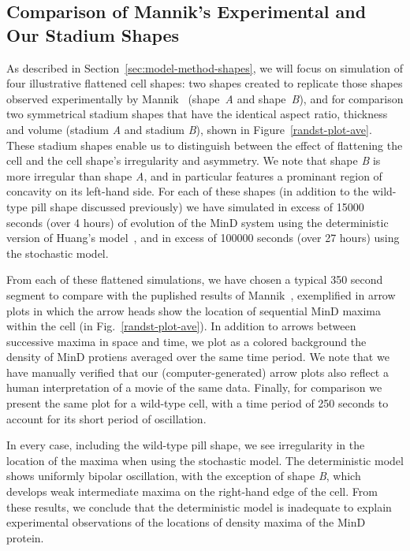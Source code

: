 \documentclass{pnastwo}
\begin{document}
\begin{article}
\section{Comparison of Mannik's Experimental and Our Stadium Shapes}
As described in Section~\ref{sec:model-method-shapes}, we will focus
on simulation of four illustrative flattened cell shapes: two shapes
created to replicate those shapes observed experimentally by
Mannik~\cite{mannik2012robustness} (shape~\emph{A} and
shape~\emph{B}), and for comparison two symmetrical stadium shapes
that have the identical aspect ratio, thickness and volume (stadium
\emph{A} and stadium \emph{B}), shown in Figure~\ref{randst-plot-ave}.
These stadium shapes enable us to distinguish between the effect of
flattening the cell and the cell shape's irregularity and asymmetry.
We note that shape \emph{B} is more irregular than shape \emph{A}, and
in particular features a prominant region of concavity on its
left-hand side.  For each of these shapes (in addition to the
wild-type pill shape discussed previously) we have simulated in excess
of 15000 seconds (over 4 hours) of evolution of the MinD system using
the deterministic version of Huang's model~\cite{huang2003dynamic},
and in excess of 100000 seconds (over 27 hours) using the stochastic
model.

From each of these flattened simulations, we have chosen a typical 350
second segment to compare with the puplished results of
Mannik~\cite{mannik2012robustness}, exemplified in arrow plots in
which the arrow heads show the location of sequential MinD maxima
within the cell (in Fig.~\ref{randst-plot-ave}).  In addition to
arrows between successive maxima in space and time, we plot as a
colored background the density of MinD protiens averaged over the same
time period.  We note that we have manually verified that our
(computer-generated) arrow plots also reflect a human interpretation
of a movie of the same data.  Finally, for comparison we present the
same plot for a wild-type cell, with a time period of 250 seconds to
account for its short period of oscillation.

In every case, including the wild-type pill shape, we see irregularity
in the location of the maxima when using the stochastic model.  The
deterministic model shows uniformly bipolar oscillation, with the
exception of shape \emph{B}, which develops weak intermediate maxima
on the right-hand edge of the cell.  From these results, we conclude
that the deterministic model is inadequate to explain experimental
observations of the locations of density maxima of the MinD protein.


\end{article}
\end{document}
